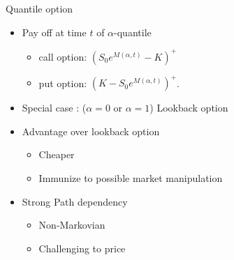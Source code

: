 \documentclass[cjk,10pt]{beamer}
\begin{document}
\begin{frame}{Quantile option}
\begin{itemize}
\item
Pay off at time $t$ of $\alpha$-quantile
\begin{itemize}
\item call option: $(S_0 e^{M(\alpha,t)} - K)^+$
\item put option: $(K - S_0 e^{M(\alpha,t)})^+$.
\end{itemize}
\item
Special case : ($\alpha=0$ or $\alpha=1$) Lookback option
\item
Advantage over lookback option
\begin{itemize}
\item
Cheaper
\item
Immunize to possible market manipulation 
\end{itemize}
\item
Strong Path dependency 
\begin{itemize}
\item
Non-Markovian 
\item
Challenging to price
\end{itemize}
\end{itemize}
\end{frame}
\end{document}
